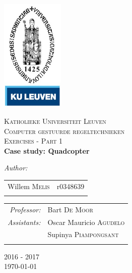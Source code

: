 \begin{titlepage}
\begin{center}

\includegraphics[width=3cm]{kuleuven.jpg}~\\[1cm]
\vfill


\textsc{\LARGE Katholieke Universiteit Leuven}\\[0.7cm]

\textsc{\Large Computer gestuurde regeltechnieken}\\[0.7cm]
\textsc{\Large Exercises - Part 1 }\\[0.7cm]



\centering \huge \bfseries Case study: Quadcopter

\end{center}

\vfill

\begin{center}
\emph{Author:} \\[.2cm]
\begin{tabular}[h]{rl}
Willem \textsc{Melis} & r0348639\\
\phantom{------------------------} & \phantom{------------------------}\\
\end{tabular}
\end{center}

\vfill

\begin{center}
\begin{tabular}[h]{rl}
\emph{Professor:} & Bart \textsc{De Moor} \\
\emph{Assistants:}&  
Oscar Mauricio  \textsc{Agudelo} \\
&  Supinya  \textsc{Piampongsant} \\
\phantom{------------------------} & \phantom{------------------------}\\
\end{tabular}
\end{center}

\vfill
\vfill
\vfill

\begin{center} 
2016 - 2017 \\[.5cm]
{\Large \today}
\end{center}

\end{titlepage}